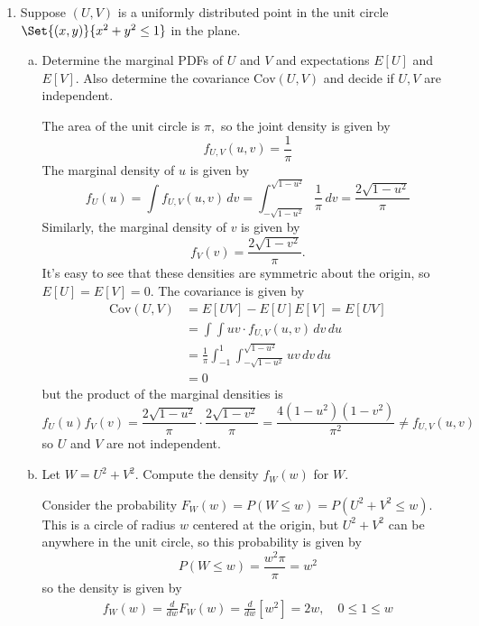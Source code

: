 \documentclass{article}
\newcommand{\cov}{\mathrm{Cov}}
\begin{document}
\begin{enumerate}
\begin{enumerate}[(a)]
		\end{enumerate}

	\item Suppose $(U, V)$ is a uniformly distributed point in the unit circle $\Set{(x, y)}{x^2+y^2\le 1}$ in the plane. 

		\begin{enumerate}[(a)]
			\item Determine the marginal PDFs of $U$ and $V$ and expectations $E[U]$ and $E[V].$ Also determine the covariance $\cov(U, V)$ and decide if $U, V$ are independent.
				\begin{soln}
					The area of the unit circle is $\pi,$ so the joint density is given by \[f_{U, V}(u, v) = \frac{1}{\pi}\] The marginal density of $u$ is given by \[f_U(u)=\int f_{U, V}(u, v)\, dv = \int_{-\sqrt{1-u^2}}^{\sqrt{1-u^2}} \frac{1}{\pi}\, dv = \frac{2\sqrt{1-u^2}}{\pi}\] Similarly, the marginal density of $v$ is given by \[f_V(v)=\frac{2\sqrt{1-v^2}}{\pi}.\] It's easy to see that these densities are symmetric about the origin, so $E[U]=E[V]=0.$ The covariance is given by 
					\begin{align*}
						\cov(U, V) &= E[UV]-E[U]E[V] = E[UV] \\
						&= \int \int uv\cdot f_{U, V}(u, v)\, dv\, du \\
						&= \frac{1}{\pi}\int_{-1}^1 \int_{-\sqrt{1-u^2}}^{\sqrt{1-u^2}}uv\, dv\, du \\
						&= 0
					\end{align*} but the product of the marginal densities is \[f_U(u)f_V(v)=\frac{2\sqrt{1-u^2}}{\pi}\cdot\frac{2\sqrt{1-v^2}}{\pi}=\frac{4(1-u^2)(1-v^2)}{\pi^2}\neq f_{U, V}(u, v)\] so $U$ and $V$ are not independent.
					
				\end{soln}

			\item Let $W=U^2+V^2.$ Compute the density $f_W(w)$ for $W.$
				\begin{soln}
					Consider the probability $F_W(w)=P(W\le w)=P(U^2+V^2\le w).$ This is a circle of radius $w$ centered at the origin, but $U^2+V^2$ can be anywhere in the unit circle, so this probability is given by \[P(W\le w)=\frac{w^2\pi}{\pi}=w^2\] so the density is given by 
					\begin{align*}
						f_W(w)=\frac{d}{dw}F_W(w) = \frac{d}{dw}\left[ w^2 \right]=2w, \quad0\le 1\le w
					\end{align*}
				\end{soln}


\end{enumerate}
\end{enumerate}
\end{document}
